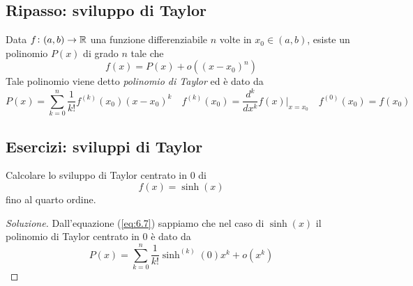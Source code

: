\subsection{Ripasso: sviluppo di Taylor}
\begin{theorem}
    \label{th:6.5}
    Data $f\colon (a,b)\to \amsbb{R}$ una funzione differenziabile $n$ volte in $x_0\in(a,b)$, esiste un polinomio $P(x)$ di grado $n$ tale che
    \[
    f(x) = P(x)+o\left((x-x_0)^n\right)
    \]
    Tale polinomio viene detto \emph{polinomio di Taylor} ed è dato da
    \begin{equation}
        \label{eq:6.7}
        P(x) = \sum_{k=0}^n \frac{1}{k!} f^{(k)}(x_0) (x- x_0)^k \quad f^{(k)}(x_0) = \frac{d^k}{dx^k}f(x)\bigg|_{x=x_0} \quad f^{(0)}(x_0) = f(x_0)
    \end{equation}
\end{theorem}
\subsection{Esercizi: sviluppi di Taylor}
\begin{exercise}
    \label{ex:6.4}
    Calcolare lo sviluppo di Taylor centrato in $0$ di 
    \[
    f(x) = \sinh(x)
    \]
    fino al quarto ordine.
\end{exercise}
\begin{proof}[Soluzione]
    Dall'equazione (\ref{eq:6.7}) sappiamo che nel caso di $\sinh(x)$ il polinomio di Taylor centrato in $0$ è dato da
    \[
    P(x) = \sum_{k=0}^n \frac{1}{k!} \sinh^{(k)}(0)x^k + o(x^k)
    \]
\end{proof}